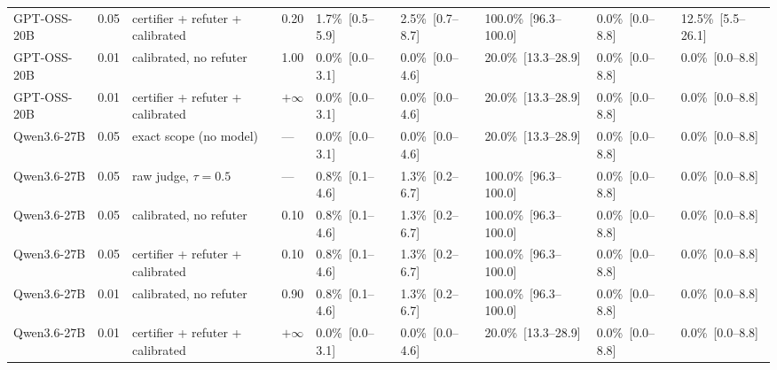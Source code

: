 \begin{table}[htbp]
{\begin{tabular}{@{}lllllllll@{}}
GPT-OSS-20B & 0.05 & certifier + refuter + calibrated & 0.20 & 1.7\%~[0.5--5.9] & 2.5\%~[0.7--8.7] & 100.0\%~[96.3--100.0] & 0.0\%~[0.0--8.8] & 12.5\%~[5.5--26.1] \\
GPT-OSS-20B & 0.01 & calibrated, no refuter & 1.00 & 0.0\%~[0.0--3.1] & 0.0\%~[0.0--4.6] & 20.0\%~[13.3--28.9] & 0.0\%~[0.0--8.8] & 0.0\%~[0.0--8.8] \\
GPT-OSS-20B & 0.01 & certifier + refuter + calibrated & $+\infty$ & 0.0\%~[0.0--3.1] & 0.0\%~[0.0--4.6] & 20.0\%~[13.3--28.9] & 0.0\%~[0.0--8.8] & 0.0\%~[0.0--8.8] \\
Qwen3.6-27B & 0.05 & exact scope (no model) & --- & 0.0\%~[0.0--3.1] & 0.0\%~[0.0--4.6] & 20.0\%~[13.3--28.9] & 0.0\%~[0.0--8.8] & 0.0\%~[0.0--8.8] \\
Qwen3.6-27B & 0.05 & raw judge, $\tau=0.5$ & --- & 0.8\%~[0.1--4.6] & 1.3\%~[0.2--6.7] & 100.0\%~[96.3--100.0] & 0.0\%~[0.0--8.8] & 0.0\%~[0.0--8.8] \\
Qwen3.6-27B & 0.05 & calibrated, no refuter & 0.10 & 0.8\%~[0.1--4.6] & 1.3\%~[0.2--6.7] & 100.0\%~[96.3--100.0] & 0.0\%~[0.0--8.8] & 0.0\%~[0.0--8.8] \\
Qwen3.6-27B & 0.05 & certifier + refuter + calibrated & 0.10 & 0.8\%~[0.1--4.6] & 1.3\%~[0.2--6.7] & 100.0\%~[96.3--100.0] & 0.0\%~[0.0--8.8] & 0.0\%~[0.0--8.8] \\
Qwen3.6-27B & 0.01 & calibrated, no refuter & 0.90 & 0.8\%~[0.1--4.6] & 1.3\%~[0.2--6.7] & 100.0\%~[96.3--100.0] & 0.0\%~[0.0--8.8] & 0.0\%~[0.0--8.8] \\
Qwen3.6-27B & 0.01 & certifier + refuter + calibrated & $+\infty$ & 0.0\%~[0.0--3.1] & 0.0\%~[0.0--4.6] & 20.0\%~[13.3--28.9] & 0.0\%~[0.0--8.8] & 0.0\%~[0.0--8.8] \\
\bottomrule
\end{tabular}}
\end{table}
